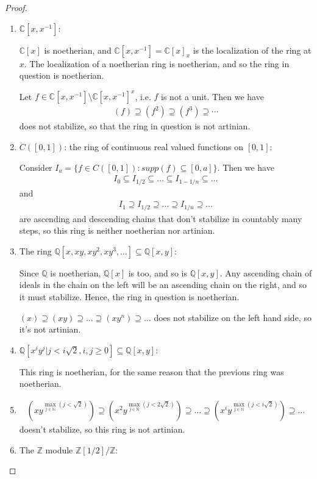\documentclass[12pt]{extarticle}
\newcommand{\set}[1]{\{#1\}}
\newcommand{\C}{\mathbb{C}}
\newcommand{\N}{\mathbb{N}}
\newcommand{\Q}{\mathbb{Q}}
\newcommand{\Z}{\mathbb{Z}}
\newcommand{\<}{\langle}
\renewcommand{\>}{\rangle}
\theoremstyle{definition}
\begin{document}
\begin{proof}
\begin{enumerate}
  \item
    $\C[x,x^{-1}]$:

    $\C[x]$ is noetherian, and $\C[x,x^{-1}] = \C[x]_x$ is the localization of the ring at $x$. The localization of a noetherian ring is noetherian, and so the ring in question is noetherian.

    Let $f \in \C[x,x^{-1}] \setminus \C[x,x^{-1}]^x$, i.e. $f$ is not a unit. Then we have
    \begin{align*}
      (f) \supseteq (f^2) \supseteq (f^3) \supseteq \cdots 
    \end{align*}
    does not stabilize, so that the ring in question is not artinian.
    
  \item
    $C([0,1])$: the ring of continuous real valued functions on $[0,1]$:

    Consider $I_a = \set{f \in C([0,1]): supp(f) \subseteq [0,a]}$. Then we have
    \begin{align*}
      I_{0} \subseteq I_{1/2} \subseteq \dots \subseteq I_{1-1/n} \subseteq \dots 
    \end{align*}
    and
    \begin{align*}
      I_{1} \supseteq I_{1/2} \supseteq \dots \supseteq I_{1/n} \supseteq \dots 
    \end{align*}
    are ascending and descending chains that don't stabilize in countably many steps, so this ring is neither noetherian nor artinian.

  \item
    The ring $\Q[x,xy,xy^2,xy^3,\dots] \subseteq \Q[x,y]$:

    Since $\Q$ is noetherian, $\Q[x]$ is too, and so is $\Q[x,y]$. Any ascending chain of ideals in the chain on the left will be an ascending chain on the right, and so it must stabilize. Hence, the ring in question is noetherian.

    $(x) \supseteq (xy) \supseteq \dots \supseteq (xy^n) \supseteq \dots $ does not stabilize on the left hand side, so it's not artinian.
  \item
    $\Q[x^iy^j|j<i\sqrt{2}, i,j \geq 0] \subseteq \Q[x,y]$:

    This ring is noetherian, for the same reason that the previous ring was noetherian.
  \item 

    \begin{align*}
      (xy^{\max\limits_{j \in \N}(j<\sqrt{2})}) \supseteq (x^2y^{\max\limits_{j \in \N}(j<2\sqrt{2})}) \supseteq \dots \supseteq (x^iy^{\max\limits_{j \in \N}(j<i\sqrt{2})}) \supseteq \dots
    \end{align*}
    doesn't stabilize, so this ring is not artinian. 
  \item
    The $\Z$ module $\Z[1/2]/\Z$:


\end{enumerate}
\end{proof}
\end{document}
